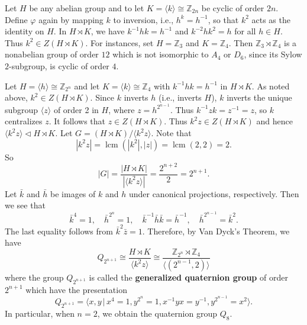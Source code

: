 \begin{example}
 Let $H$ be any abelian group and to let $K = \langle k \rangle \cong \mathbb{Z}_{2n}$ be cyclic of order $2n$. Define $\varphi$ again by mapping $k$ to inversion, i.e., $h^k = h^{-1}$, so that $k^2$ acts as the identity on $H$. In $H\rtimes K$, we have $k^{-1}hk = h^{-1}$ and $k^{-2}hk^2 = h$ for all $h \in H$. Thus $k^2 \in Z(H\rtimes K)$. For instances, set $H = \mathbb{Z}_3$ and $K = \mathbb{Z}_4$. Then $\mathbb{Z}_3 \rtimes \mathbb{Z}_4$ is a nonabelian group of order $12$ which is not isomorphic to $A_4$ or $D_{6}$, since its Sylow $2$-subgroup,  is cyclic of order $4$.
\end{example}

\begin{example}
	Let $H = \langle h \rangle \cong \mathbb{Z}_{2^n}$ and let $K = \langle k \rangle \cong \mathbb{Z}_4$ with $k^{-1}hk = h^{-1}$ in $H\rtimes K$. As noted above, $k^2 \in Z(H\rtimes K)$. Since $k$ inverts $h$ (i.e., inverts $H$), $k$ inverts the unique subgroup $\langle z \rangle$ of order 2 in $H$, where $z = h^{2^{n-1}}$. Thus $k^{-1}zk = z^{-1} = z$, so $k$ centralizes $z$. It follows that $z \in Z(H\rtimes K)$. Thus $k^2z \in Z(H\rtimes K)$ and hence $\langle k^2z \rangle \lhd H\rtimes K$. Let $G = (H\rtimes K)/\langle k^2z \rangle$. Note that
	\begin{equation*}
		|k^2z| = \operatorname{lcm}(|k^2|,  |z|) = \operatorname{lcm}(2,2) =  2.
	\end{equation*} So 
	\begin{equation*}
		|G| = \frac{|H\rtimes K|}{|\langle k^2z\rangle|} = \frac{2^{n+2}}{2} = 2^{n+1}.
	\end{equation*}
	Let $\bar{k}$ and $\bar{h}$ be images of $k$ and $h$ under canonical projections, respectively. Then we see that 
	\begin{equation*}
		\bar{k}^4 = 1,\quad \bar{h}^{2^n} =1,\quad \bar{k}^{-1}\bar{h}\bar{k} = \bar{h}^{-1},\quad  \bar{h}^{2^{n-1}} = \bar{k}^2.
	\end{equation*}
	The last equality follows from $\bar{k}^2 \bar{z} = 1$. Therefore, by Van Dyck's Theorem, we have
	\begin{equation*}
		Q_{2^{n+1}}\cong  \frac{H\rtimes K}{\langle k^2z \rangle} \cong \frac{\mathbb{Z}_{2^n} \rtimes \mathbb{Z}_4}{\langle (2^{n-1},2) \rangle} 
	\end{equation*}
	where the group $Q_{2^{n+1}}$ is called the \textbf{generalized quaternion group} of order $2^{n+1}$ which have the presentation
	\begin{equation*}
		Q_{2^{n+1}} = \langle x,y \,|\, x^4 = 1, y^{2^{n}} = 1, x^{-1}yx = y^{-1}, y^{2^{n-1}}=x^2\rangle.
	\end{equation*}
	In particular, when $n=2$, we obtain the quaternion group $Q_{8}$.
\end{example}

